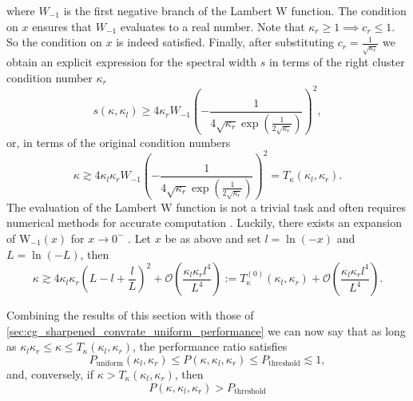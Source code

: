 where $W_{-1}$ is the first negative branch of the Lambert $\mathrm{W}$ function. The condition on $x$ ensures that $W_{-1}$ evaluates to a real number. Note that $\kappa_r\geq1 \implies c_r \leq 1$. So the condition on $x$ is indeed satisfied. Finally, after substituting $c_r = \frac{1}{\sqrt{\kappa_r}}$ we obtain an explicit expression for the spectral width $s$ in terms of the right cluster condition number $\kappa_r$
\[
    s(\kappa, \kappa_l) \geq 4\kappa_r W_{-1}\left(-\frac{1}{4\sqrt{\kappa_r}\exp\left(\frac{1}{2\sqrt{\kappa_r}}\right)}\right)^2,
\]
or, in terms of the original condition numbers
\begin{equation}
    \kappa \gtrsim 4\kappa_l\kappa_r W_{-1}\left(-\frac{1}{4\sqrt{\kappa_r}\exp\left(\frac{1}{2\sqrt{\kappa_r}}\right)}\right)^2 = T_{\kappa}(\kappa_l, \kappa_r).
    \label{eq:threshold_inequality_explicit}    
\end{equation}
The evaluation of the Lambert $\mathrm{W}$ function is not a trivial task and often requires numerical methods for accurate computation \cite{evaluation_of_the_lambert_w_function_Corless1996}. Luckily, there exists an expansion of $\mathrm{W}_{-1}(x)$ for $x\rightarrow0^-$ \cite[Equation 4.19]{evaluation_of_the_lambert_w_function_Corless1996}. Let $x$ be as above and set $l = \ln(-x)$ and $L = \ln(-L)$, then
\begin{equation}
    \kappa \gtrsim 4\kappa_l\kappa_r \left(L - l + \frac{l}{L}\right)^2 + \mathcal{O}\left(\frac{\kappa_l\kappa_rl^4}{L^4}\right) := T^{(0)}_{\kappa}(\kappa_l, \kappa_r) + \mathcal{O}\left(\frac{\kappa_l\kappa_rl^4}{L^4}\right).
    \label{eq:threshold_inequality_explicit_expansion}    
\end{equation}

Combining the results of this section with those of \cref{sec:cg_sharpened_convrate_uniform_performance} we can now say that as long as $\kappa_l\kappa_r \leq \kappa \leq T_{\kappa}(\kappa_l, \kappa_r)$, the performance ratio satisfies
\begin{equation}
    P_{\text{uniform}}(\kappa_l, \kappa_r) \leq P(\kappa, \kappa_l, \kappa_r) \leq P_{\text{threshold}} \lesssim 1,
    \label{eq:performance_bounds}
\end{equation}
and, conversely, if $\kappa > T_{\kappa}(\kappa_l, \kappa_r)$, then 
\[
    P(\kappa, \kappa_l, \kappa_r) > P_{\text{threshold}}
\]

